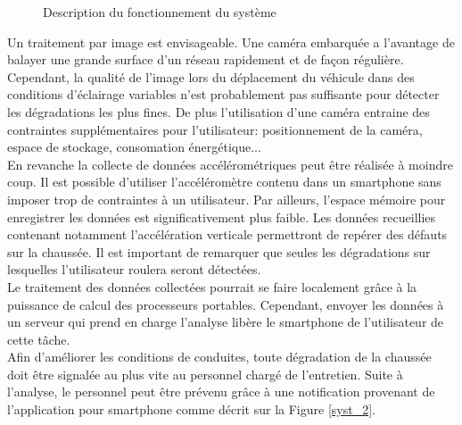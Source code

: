 \begin{figure}[H]
    \centering
    \caption{Description du fonctionnement du système}
    \label{syst_1}
\end{figure}

Un traitement par image est envisageable. Une caméra embarquée a
l'avantage de balayer une grande surface d'un réseau rapidement et de façon
régulière. Cependant, la qualité de l'image lors du déplacement du véhicule
dans des conditions d'éclairage variables n'est probablement pas suffisante
pour détecter les dégradations les plus fines. De plus l'utilisation d'une
caméra entraine des contraintes supplémentaires pour l'utilisateur:
positionnement de la caméra, espace de
stockage, consomation énergétique...\\

En revanche la collecte de données accélérométriques peut être réalisée à
moindre coup. Il est possible d'utiliser l'accéléromètre contenu dans un
smartphone sans imposer trop de
contraintes à un utilisateur. Par ailleurs, l'espace mémoire pour enregistrer
les données est significativement plus faible. Les données recueillies
contenant notamment l'accélération verticale permettront de repérer des défauts
sur la chaussée. Il est important de remarquer que seules les dégradations sur
lesquelles l'utilisateur roulera seront détectées.\\

Le traitement des données collectées pourrait se faire localement grâce à la
puissance de calcul des processeurs portables. Cependant, envoyer les données à
un serveur qui prend en charge l'analyse libère le smartphone de l'utilisateur
de cette tâche.\\

Afin d'améliorer les conditions de conduites, toute dégradation de la chaussée
doit être signalée au plus vite au personnel chargé de l'entretien. Suite à
l'analyse, le
personnel peut être prévenu grâce à une notification provenant de l'application
pour smartphone comme décrit sur la Figure \ref{syst_2}.\\

